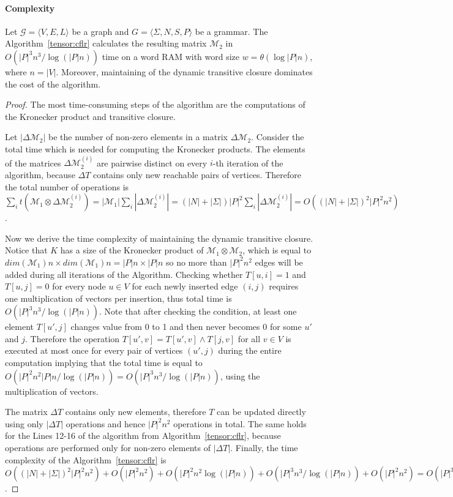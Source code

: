 \paragraph*{Complexity}

\begin{theorem}{}
\label{theorem: subcubic}
    Let $\mathcal{G} = \langle V,E,L \rangle$ be a graph and $G = \langle\Sigma, N, S, P\rangle$ be a grammar.
    The Algorithm~\ref{tensor:cflr} calculates the resulting matrix $\mathcal{M}_2$ in $O({|P|}^3n^3/\log (|P|n))$ time on a word RAM with word size $w= \theta(\log |P|n)$, where $n = |V|$. Moreover, maintaining of the dynamic transitive closure dominates the cost of the algorithm.
\end{theorem}


\begin{proof}
The most time-consuming steps of the algorithm are the computations of the Kronecker product and transitive closure.

 Let $|\Delta\mathcal{M}_2|$ be the number of non-zero elements in a matrix $\Delta\mathcal{M}_2$. Consider the total time which is needed for computing the Kronecker products. The elements of the matrices $\Delta\mathcal{M}_2^{(i)}$ are pairwise distinct on every $i$-th iteration of the algorithm, because $\Delta T$ contains only new reachable pairs of vertices.  Therefore the total number of operations is $\sum\limits_i{t(\mathcal{M}_1 \otimes \Delta\mathcal{M}_2^{(i)})} = |\mathcal{M}_1| \sum\limits_i {|\Delta\mathcal{M}_2^{(i)}|} = (|N| + |\Sigma|){|P|}^2 \sum\limits_i {|\Delta\mathcal{M}_2^{(i)}|} = O({(|N| + |\Sigma|)}^2{|P|}^2 n^2)$.

Now we derive the time complexity of maintaining the dynamic transitive closure.
Notice that $K$ has a size of the Kronecker product of $\mathcal{M}_1 \otimes \mathcal{M}_2$, which is equal to $dim(\mathcal{M}_1)n \times dim(\mathcal{M}_1)n = |P|n \times |P|n$ so no more than ${|P|}^2n^2$ edges will be added during all iterations of the Algorithm.
Checking whether $T[u, i] = 1$ and $T[u, j]=0$ for every node $u \in V$ for each newly inserted edge $(i, j)$ requires one multiplication of vectors per insertion, thus total time is $O({|P|}^3n^3/\log (|P|n))$.
Note that after checking the condition, at least one element $T[u', j]$ changes value from 0 to 1 and then never becomes 0 for some $u'$ and $j$.
Therefore the operation $T[u',v] = T[u', v] \wedge T[j, v]$ for all $v \in V$ is executed at most once for every pair of vertices $(u',j)$ during the entire computation implying that the total time is equal to $O({|P|}^2n^2|P|n/\log (|P|n))=O({|P|}^3n^3/\log (|P|n))$, using the  multiplication of vectors.

The matrix $\Delta T$ contains only new elements, therefore $T$ can be updated directly using only $|\Delta T|$ operations and hence ${|P|}^2n^2$ operations in total.
The same holds for the Lines 12-16 of the algorithm from Algorithm~\ref{tensor:cflr}, because operations are performed only for non-zero elements of $|\Delta T|$.
Finally, the time complexity of the Algorithm~\ref{tensor:cflr} is $O({(|N| + |\Sigma|)}^2{|P|}^2 n^2) + O({|P|}^2n^2) + O({|P|}^2n^2 \log (|P|n)) + O({|P|}^3n^3/\log (|P|n)) + O({|P|}^2n^2)= O({|P|}^3n^3/\log (|P|n))$. 
\end{proof}
